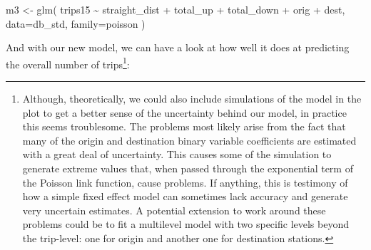 \documentclass[
  letterpaper,
  krantz2]{style/krantz}
\newenvironment{Shaded}{\begin{snugshade}}{\end{snugshade}}
\newcommand{\AttributeTok}[1]{\textcolor[rgb]{0.40,0.45,0.13}{#1}}
\newcommand{\FunctionTok}[1]{\textcolor[rgb]{0.28,0.35,0.67}{#1}}
\newcommand{\NormalTok}[1]{\textcolor[rgb]{0.00,0.23,0.31}{#1}}
\newcommand{\OtherTok}[1]{\textcolor[rgb]{0.00,0.23,0.31}{#1}}
\newcommand{\StringTok}[1]{\textcolor[rgb]{0.13,0.47,0.30}{#1}}
\begin{document}
\begin{Shaded}
\begin{Highlighting}[]
\NormalTok{m3 }\OtherTok{\textless{}{-}} \FunctionTok{glm}\NormalTok{(}
  \StringTok{\textquotesingle{}trips15 \textasciitilde{} straight\_dist + total\_up + total\_down + orig + dest\textquotesingle{}}\NormalTok{, }
  \AttributeTok{data=}\NormalTok{db\_std,}
  \AttributeTok{family=}\NormalTok{poisson}
\NormalTok{)}
\end{Highlighting}
\end{Shaded}

And with our new model, we can have a look at how well it does at
predicting the overall number of trips\footnote{Although, theoretically,
  we could also include simulations of the model in the plot to get a
  better sense of the uncertainty behind our model, in practice this
  seems troublesome. The problems most likely arise from the fact that
  many of the origin and destination binary variable coefficients are
  estimated with a great deal of uncertainty. This causes some of the
  simulation to generate extreme values that, when passed through the
  exponential term of the Poisson link function, cause problems. If
  anything, this is testimony of how a simple fixed effect model can
  sometimes lack accuracy and generate very uncertain estimates. A
  potential extension to work around these problems could be to fit a
  multilevel model with two specific levels beyond the trip-level: one
  for origin and another one for destination stations.}:
\end{document}
